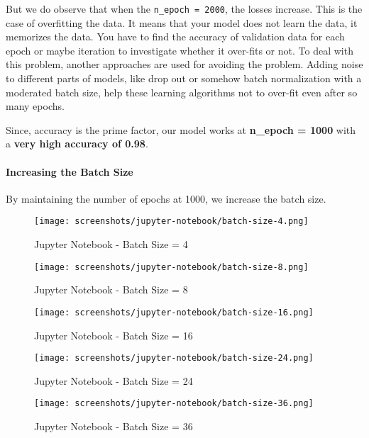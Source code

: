 But we do observe that when the \texttt{n\_epoch = 2000}, the losses increase. This is the case of overfitting the data. It means that your model does not learn the data, it memorizes the data. You have to find the accuracy of validation data for each epoch or maybe iteration to investigate whether it over-fits or not. To deal with this problem, another approaches are used for avoiding the problem. Adding noise to different parts of models, like drop out or somehow batch normalization with a moderated batch size, help these learning algorithms not to over-fit even after so many epochs.

Since, accuracy is the prime factor, our model works at \textbf{n\_epoch = 1000} with a \textbf{very high accuracy of 0.98}.

\paragraph{Increasing the Batch Size}

By maintaining the number of epochs at 1000, we increase the batch size.

\begin{figure}[H]
    \centering
    \texttt{[image: screenshots/jupyter-notebook/batch-size-4.png]}
    \caption{Jupyter Notebook - Batch Size = 4}
\end{figure}

\begin{figure}[H]
    \centering
    \texttt{[image: screenshots/jupyter-notebook/batch-size-8.png]}
    \caption{Jupyter Notebook - Batch Size = 8}
\end{figure}

\begin{figure}[H]
    \centering
    \texttt{[image: screenshots/jupyter-notebook/batch-size-16.png]}
    \caption{Jupyter Notebook - Batch Size = 16}
\end{figure}

\begin{figure}[H]
    \centering
    \texttt{[image: screenshots/jupyter-notebook/batch-size-24.png]}
    \caption{Jupyter Notebook - Batch Size = 24}
\end{figure}

\begin{figure}[H]
    \centering
    \texttt{[image: screenshots/jupyter-notebook/batch-size-36.png]}
    \caption{Jupyter Notebook - Batch Size = 36}
\end{figure}


